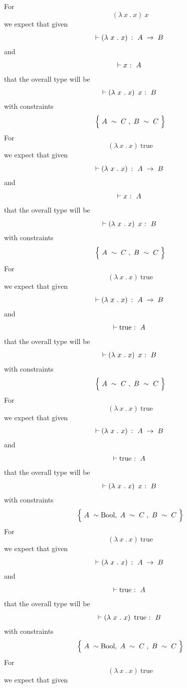 \begin{frame}
\begin{overprint}
    \onslide<+>
  For
  \[\left( \lambda~x~.~x \right)~x \]
  we expect that given
  \[ \vdash \left( \lambda~x~.~x \right)~{:}~\highlight[white]{A} \rightarrow \highlight[white]{B}\]
  and
  \[ \vdash x~{:}~\highlight[white]{A} \]
  that the overall type will be
  \[ \vdash \left( \lambda~x~.~x \right)~x~{:}~\highlight[white]{B}\]
  with constraints
  \[ \left\{ \highlight[white]{A} \sim \highlight[white]{C} , \highlight[white]{B} \sim \highlight[white]{C} \right\} \]
    \onslide<+>
  For
  \[\left( \lambda~x~.~x \right)~\text{true} \]
  we expect that given
  \[ \vdash \left( \lambda~x~.~x \right)~{:}~\highlight[white]{A} \rightarrow \highlight[white]{B}\]
  and
  \[ \vdash x~{:}~\highlight[white]{A} \]
  that the overall type will be
  \[ \vdash \left( \lambda~x~.~x \right)~x~{:}~\highlight[white]{B}\]
  with constraints
  \[ \left\{ \highlight[white]{A} \sim \highlight[white]{C} , \highlight[white]{B} \sim \highlight[white]{C} \right\} \]
    \onslide<+>
  For
  \[\left( \lambda~x~.~x \right)~\text{true} \]
  we expect that given
  \[ \vdash \left( \lambda~x~.~x \right)~{:}~\highlight[white]{A} \rightarrow \highlight[white]{B}\]
  and
  \[ \vdash \text{true}~{:}~\highlight[white]{A} \]
  that the overall type will be
  \[ \vdash \left( \lambda~x~.~x \right)~x~{:}~\highlight[white]{B}\]
  with constraints
  \[ \left\{ \highlight[white]{A} \sim \highlight[white]{C} , \highlight[white]{B} \sim \highlight[white]{C} \right\} \]
    \onslide<+>
  For
  \[\left( \lambda~x~.~x \right)~\text{true} \]
  we expect that given
  \[ \vdash \left( \lambda~x~.~x \right)~{:}~\highlight[white]{A} \rightarrow \highlight[white]{B}\]
  and
  \[ \vdash \text{true}~{:}~\highlight[white]{A} \]
  that the overall type will be
  \[ \vdash \left( \lambda~x~.~x \right)~x~{:}~\highlight[white]{B}\]
  with constraints
  \[ \left\{ \highlight[white]{A} \sim \text{Bool}, \highlight[white]{A} \sim \highlight[white]{C} , \highlight[white]{B} \sim \highlight[white]{C} \right\} \]
    \onslide<+>
  For
  \[\left( \lambda~x~.~x \right)~\text{true} \]
  we expect that given
  \[ \vdash \left( \lambda~x~.~x \right)~{:}~\highlight[white]{A} \rightarrow \highlight[white]{B}\]
  and
  \[ \vdash \text{true}~{:}~\highlight[white]{A} \]
  that the overall type will be
  \[ \vdash \left( \lambda~x~.~x \right)~\text{true}~{:}~\highlight[white]{B}\]
  with constraints
  \[ \left\{ \highlight[white]{A} \sim \text{Bool}, \highlight[white]{A} \sim \highlight[white]{C} , \highlight[white]{B} \sim \highlight[white]{C} \right\} \]
    \onslide<+>
  For
  \[\left( \lambda~x~.~x \right)~\text{true} \]
  we expect that given

\end{overprint}
\end{frame}
